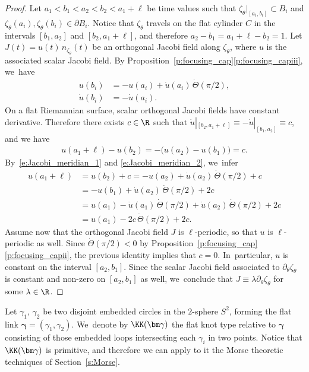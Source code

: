 \begin{proof}
Let $a_1<b_1<a_2<b_2<a_1+\ell$ be time values such that $\zeta_\theta|_{[a_i,b_i]}\subset B_i$ and $\zeta_\theta(a_i),\zeta_\theta(b_i)\in\partial B_i$. Notice that $\zeta_\theta$ travels on the flat cylinder $C$ in the intervals $[b_1,a_2]$ and $[b_2,a_1+\ell]$, and therefore $a_2-b_1=a_1+\ell-b_2=1$. Let $J(t)=u(t)\,n_{\zeta_\theta}(t)$ be an orthogonal Jacobi field along $\zeta_\theta$, where $u$ is the associated scalar Jacobi field.
By Proposition~\ref{p:focusing_cap}\eqref{p:focusing_capiii}, we~have
\begin{equation}
\label{e:Jacobi_meridian_1}
\begin{split}
u(b_i) & = -u(a_i)+\dot u(a_i)\,\dot\Theta(\pi/2),
\\
\dot u(b_i) & = -\dot u(a_i).
\end{split}
\end{equation}
On a flat Riemannian surface, scalar orthogonal Jacobi fields have constant derivative. Therefore there exists $c\in\R$ such that
$\dot u|_{[b_2,a_1+\ell]}\equiv - \dot u|_{[b_1,a_2]} \equiv c$,
and we have
\begin{align}
\label{e:Jacobi_meridian_2}
u(a_1+\ell)-u(b_2)
=
-\big(u(a_2)-u(b_1)\big)
=
c.
\end{align}
By~\eqref{e:Jacobi_meridian_1} and \eqref{e:Jacobi_meridian_2}, we~infer
\begin{align*}
u(a_1+\ell)
& = u(b_2)+c
= -u(a_2) + \dot u(a_2)\,\dot\Theta(\pi/2) +c \\
& = -u(b_1) + \dot u(a_2)\,\dot\Theta(\pi/2) + 2c \\
& = u(a_1) - \dot u(a_1)\,\dot\Theta(\pi/2) + \dot u(a_2)\,\dot\Theta(\pi/2) + 2c\\
& = u(a_1) -2c\,\dot\Theta(\pi/2) + 2c.
\end{align*}
Assume now that the orthogonal Jacobi field $J$ is $\ell$-periodic, so that $u$ is $\ell$-periodic as well. Since $\dot\Theta(\pi/2)<0$ by Proposition~\ref{p:focusing_cap}\eqref{p:focusing_capii}, the previous identity implies that $c=0$. In~particular, $u$ is constant on the interval $[a_2,b_1]$. Since the scalar Jacobi field associated to $\partial_\theta\zeta_\theta$ is constant and non-zero on $[a_2,b_1]$ as well, we~conclude that $J\equiv\lambda \partial_\theta\zeta_\theta$ for some $\lambda\in\R$.
\end{proof}

Let $\gamma_1$, $\gamma_2$ be two disjoint embedded circles in the $2$-sphere $S^2$, forming the flat link $\bm\gamma=(\gamma_1,\gamma_2)$. We~denote by $\KK(\bm\gamma)$ the flat knot type relative to $\bm\gamma$ consisting of those embedded loops intersecting each $\gamma_i$ in two points. Notice that $\KK(\bm\gamma)$ is primitive, and therefore we can apply to it the Morse theoretic techniques of Section~\ref{s:Morse}.

